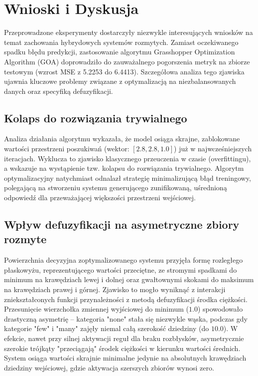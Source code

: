\documentclass[12pt, a4paper]{article}
\begin{document}
\section{Wnioski i Dyskusja}

Przeprowadzone eksperymenty dostarczyły niezwykle interesujących wniosków na temat zachowania hybrydowych systemów rozmytych. Zamiast oczekiwanego spadku błędu predykcji, zastosowanie algorytmu Grasshopper Optimization Algorithm (GOA) doprowadziło do zauważalnego pogorszenia metryk na zbiorze testowym (wzrost MSE z 5.2253 do 6.4413). Szczegółowa analiza tego zjawiska ujawnia kluczowe problemy związane z optymalizacją na niezbalansowanych danych oraz specyfiką defuzyfikacji.

\subsection{Kolaps do rozwiązania trywialnego}
Analiza działania algorytmu wykazała, że model osiąga skrajne, zablokowane wartości przestrzeni poszukiwań (wektor: $[2.8, 2.8, 1.0]$) już w najwcześniejszych iteracjach. Wyklucza to zjawisko klasycznego przeuczenia w czasie (overfittingu), a wskazuje na wystąpienie tzw. kolapsu do rozwiązania trywialnego. Algorytm optymalizacyjny natychmiast odnalazł strategię minimalizującą błąd treningowy, polegającą na stworzeniu systemu generującego zunifikowaną, uśrednioną odpowiedź dla przeważającej większości przestrzeni wejściowej.

\subsection{Wpływ defuzyfikacji na asymetryczne zbiory rozmyte}
Powierzchnia decyzyjna zoptymalizowanego systemu przyjęła formę rozległego płaskowyżu, reprezentującego wartości przeciętne, ze stromymi spadkami do minimum na krawędziach lewej i dolnej oraz gwałtownymi skokami do maksimum na krawędziach prawej i górnej. Zjawisko to mogło wyniknąć z interakcji zniekształconych funkcji przynależności z metodą defuzyfikacji środka ciężkości. Przesunięcie wierzchołka zmiennej wyjściowej do minimum ($1.0$) spowodowało drastyczną asymetrię – kategoria "none" stała się niezwykle wąska, podczas gdy kategorie "few" i "many" zajęły niemal całą szerokość dziedziny (do $10.0$). W efekcie, nawet przy silnej aktywacji reguł dla braku rozbłysków, asymetrycznie szerokie trójkąty "przeciągają" środek ciężkości w kierunku wartości średnich. System osiąga wartości skrajnie minimalne jedynie na absolutnych krawędziach dziedziny wejściowej, gdzie aktywacja szerszych zbiorów wynosi zero.
\end{document}
